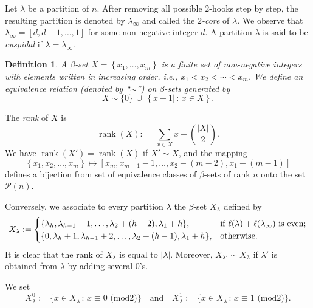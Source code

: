 \documentclass[12pt]{amsart}
\numberwithin{equation}{subsection}
\newtheorem{defn}[equation]{Definition}
\newcommand{\cP}{\mathcal{P}}
\newcommand{\rank}{\operatorname{rank}}
\def\modu{{\mathrm{mod}}}
\def\modu{{\mathrm{mod}}}
\begin{document}
Let $\lambda$ be a partition of $n$. After removing all possible $2$-hooks step by step, the resulting partition is denoted by $\lambda_\infty$ and called the \textit{$2$-core} of $\lambda$. 
We observe that $\lambda_\infty= [d,d-1, \ldots, 1]$ for some non-negative integer $d$. A partition $\lambda$  is said to be \textit{cuspidal} if $\lambda=\lambda_\infty$.

\begin{defn} A $\beta$-set $X = \left\{x_1,\ldots,x_m\right\}$ is a finite set of non-negative integers with elements written in increasing order, i.e., $x_1 < x_2 <\cdots<  x_m$. We define an equivalence relation (denoted by “$\sim$”) on $\beta$-sets generated by
\[X \sim \{0\}\,\cup\,\left\{ x + 1 |\,:\,x \in X\right\} .\]
\end{defn}
The \textit{rank} of $X$ is 
\[\rank(X): = \sum_{x\in X}x-\binom{|X|}{2}.\]
We have $\rank(X')=\rank(X)$ if $X'\sim X$, and the mapping
\begin{equation}
 \left\{x_1, x_2 ,\ldots,x_m\right\} \mapsto [x_m,x_{m-1}-1,\ldots, x_2-(m-2),x_1- (m -1)]
\end{equation}
defines a bijection from set of equivalence classes of $\beta$-sets of rank $n$ onto the set $\cP(n)$.

Conversely, we associate to every partition $\lambda$  the  $\beta$-set $X_\lambda$ defined by
\begin{equation} \label{eqn:b-set}
X_\lambda:=
\begin{cases}
\{\lambda_h,\lambda_{h-1}+1,\ldots,\lambda_2+(h-2),\lambda_1+h\}, &\text{if $\ell(\lambda)+\ell(\lambda_\infty)$ is even;}\cr
\{0,\lambda_h+1,\lambda_{h-1}+2,\ldots,\lambda_2+(h-1), \lambda_1+h\}, &\text{otherwise.}
\end{cases}
\end{equation}
It is clear that the rank of $X_\lambda$ is equal to $|\lambda|$. Moreover, $X_{\lambda'}\sim X_\lambda$ if $\lambda'$ is obtained
from $\lambda$ by adding several $0$’s.

We set
\begin{equation}
X_\lambda^0:=\{x\in X_\lambda\,:\,x\equiv 0 \text{ ($\modu 2$)}\}
\quad\text{and}\quad
X_\lambda^1:=\{x\in X_\lambda\,:\,x\equiv 1 \text{ ($\modu 2$)}\}  .
\end{equation}
\end{document}
